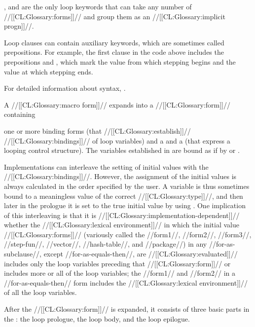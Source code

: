 , and   are the only loop keywords that can take any number of //[[CL:Glossary:forms]]// and  group them as an //[[CL:Glossary:implicit progn]]//.

Loop clauses can contain auxiliary keywords, which are sometimes called prepositions.  For example, the first clause in the code above includes the prepositions  and ,  which mark the value from which stepping begins and the value at which stepping ends.

For detailed information about  syntax, .

\endsubsubsection%

A  //[[CL:Glossary:macro form]]// expands into a //[[CL:Glossary:form]]// containing

one or more binding forms (that //[[CL:Glossary:establish]]// //[[CL:Glossary:bindings]]// of loop variables) and a  and a  (that express a looping control  structure). The variables established in  are bound as if by  or .  

Implementations can interleave the setting of initial values with the //[[CL:Glossary:bindings]]//.   However, the assignment of the initial values is always calculated in the order specified by the user.  A variable is thus sometimes bound to a meaningless value  of the correct //[[CL:Glossary:type]]//, and then later in the prologue it is set to the true initial value by using .  One implication of this interleaving is that it is //[[CL:Glossary:implementation-dependent]]// whether the //[[CL:Glossary:lexical environment]]// in which the initial value //[[CL:Glossary:forms]]// (variously called the //form1//, //form2//, //form3//, //step-fun//,
 //vector//, //hash-table//, and //package//) in any //for-as-subclause//, except //for-as-equals-then//, are //[[CL:Glossary:evaluated]]// includes only the loop variables preceding that //[[CL:Glossary:form]]// or includes more or all of the loop variables; the //form1// and //form2// in a //for-as-equals-then// form includes the //[[CL:Glossary:lexical environment]]// of all the loop variables.

 

After the //[[CL:Glossary:form]]// is expanded, it consists of three basic parts in the  : 
      the loop prologue,
      the loop body,
  and the loop epilogue.

